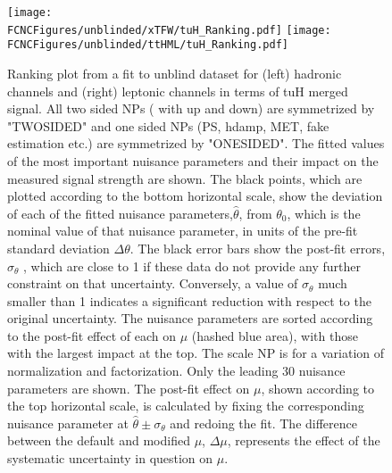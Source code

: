 \begin{figure}[htb]
\centering
\texttt{[image: \\FCNCFigures/unblinded/xTFW/tuH\_Ranking.pdf]}
\texttt{[image: \\FCNCFigures/unblinded/ttHML/tuH\_Ranking.pdf]}
\caption{ Ranking plot from a fit to unblind dataset for (left) hadronic channels and (right)
leptonic channels in terms of tuH merged signal. All two sided NPs ( with up and down) are symmetrized by "TWOSIDED" and one sided NPs (PS, hdamp, MET, fake estimation etc.) are symmetrized by "ONESIDED". The fitted values of the most important nuisance parameters and their impact on the measured
signal strength are shown. The black points, which are plotted according to the bottom horizontal scale, show the deviation
of each of the fitted nuisance parameters,$\hat{\theta}$, from $\theta_{0}$, which is the nominal value of that nuisance parameter, in units of the
pre-fit standard deviation $\Delta\theta$. The black error bars show the post-fit errors, $\sigma_{\theta}$ , which are close to 1 if these data do not
provide any further constraint on that uncertainty. Conversely, a value of $\sigma_{\theta}$ much smaller than 1 indicates a significant
reduction with respect to the original uncertainty. The nuisance parameters are sorted according to the post-fit effect of each on $\mu$ (hashed blue area),
with those with the largest impact at the top. The scale NP is for a variation of normalization and factorization. Only the leading 30 nuisance parameters are shown. The post-fit effect on $\mu$,
shown according to the top horizontal scale, is calculated by fixing the corresponding nuisance parameter at $\hat{\theta}\pm \sigma_{\theta}$ and
redoing the fit. The difference between the default and modified $\mu$, $\Delta\mu$, represents the effect of the systematic uncertainty
in question on $\mu$.}
\label{fig:fcnc_rank_data}
\end{figure}

